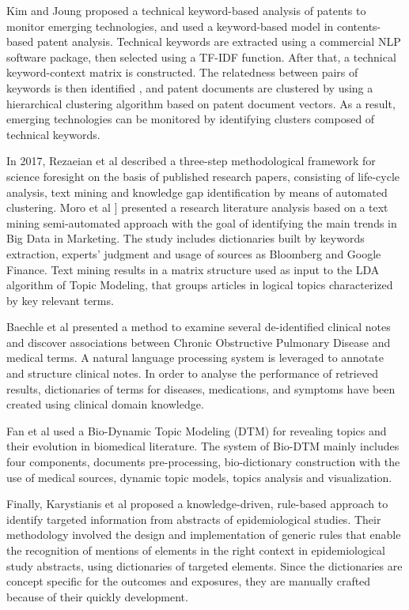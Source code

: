 \documentclass[]{book}
\theoremstyle{definition}
\theoremstyle{definition}
\theoremstyle{definition}
\theoremstyle{remark}
\begin{document}
Kim and Joung \citep{joung2017monitoring} proposed a technical
keyword-based analysis of patents to monitor emerging technologies, and
used a keyword-based model in contents-based patent analysis. Technical
keywords are extracted using a commercial NLP software package, then
selected using a TF-IDF function. After that, a technical
keyword-context matrix is constructed. The relatedness between pairs of
keywords is then identified , and patent documents are clustered by
using a hierarchical clustering algorithm based on patent document
vectors. As a result, emerging technologies can be monitored by
identifying clusters composed of technical keywords.

In 2017, Rezaeian et al \citep{rezaeian2017science} described a
three-step methodological framework for science foresight on the basis
of published research papers, consisting of life-cycle analysis, text
mining and knowledge gap identification by means of automated
clustering. Moro et al \citet{amado2018research}{]} presented a research
literature analysis based on a text mining semi-automated approach with
the goal of identifying the main trends in Big Data in Marketing. The
study includes dictionaries built by keywords extraction, experts'
judgment and usage of sources as Bloomberg and Google Finance. Text
mining results in a matrix structure used as input to the LDA algorithm
of Topic Modeling, that groups articles in logical topics characterized
by key relevant terms.

Baechle et al \citep{baechle2017big} presented a method to examine
several de-identified clinical notes and discover associations between
Chronic Obstructive Pulmonary Disease and medical terms. A natural
language processing system is leveraged to annotate and structure
clinical notes. In order to analyse the performance of retrieved
results, dictionaries of terms for diseases, medications, and symptoms
have been created using clinical domain knowledge.

Fan et al \citep{chen2017revealing} used a Bio-Dynamic Topic Modeling
(DTM) for revealing topics and their evolution in biomedical literature.
The system of Bio-DTM mainly includes four components, documents
pre-processing, bio-dictionary construction with the use of medical
sources, dynamic topic models, topics analysis and visualization.

Finally, Karystianis et al \citep{karystianis2017evaluation} proposed a
knowledge-driven, rule-based approach to identify targeted information
from abstracts of epidemiological studies. Their methodology involved
the design and implementation of generic rules that enable the
recognition of mentions of elements in the right context in
epidemiological study abstracts, using dictionaries of targeted
elements. Since the dictionaries are concept specific for the outcomes
and exposures, they are manually crafted because of their quickly
development.
\end{document}
